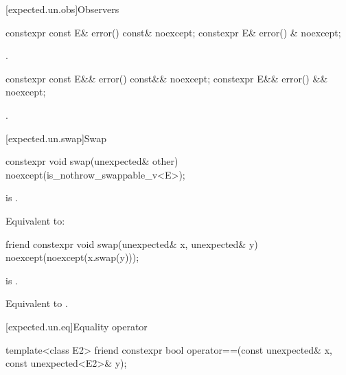 [expected.un.obs]{Observers}

%
\begin{itemdecl}
constexpr const E& error() const& noexcept;
constexpr E& error() & noexcept;
\end{itemdecl}

\begin{itemdescr}
\pnum
\returns
{}.
\end{itemdescr}

%
\begin{itemdecl}
constexpr const E&& error() const&& noexcept;
constexpr E&& error() && noexcept;
\end{itemdecl}

\begin{itemdescr}
\pnum
\returns
{}.
\end{itemdescr}

[expected.un.swap]{Swap}

%
\begin{itemdecl}
constexpr void swap(unexpected& other) noexcept(is_nothrow_swappable_v<E>);
\end{itemdecl}

\begin{itemdescr}
\pnum
\mandates
{} is .

\pnum
\effects
Equivalent to: 
\end{itemdescr}

%
\begin{itemdecl}
friend constexpr void swap(unexpected& x, unexpected& y) noexcept(noexcept(x.swap(y)));
\end{itemdecl}

\begin{itemdescr}
\pnum
\constraints
{} is .

\pnum
\effects
Equivalent to .
\end{itemdescr}

[expected.un.eq]{Equality operator}

%
\begin{itemdecl}
template<class E2>
  friend constexpr bool operator==(const unexpected& x, const unexpected<E2>& y);
\end{itemdecl}

